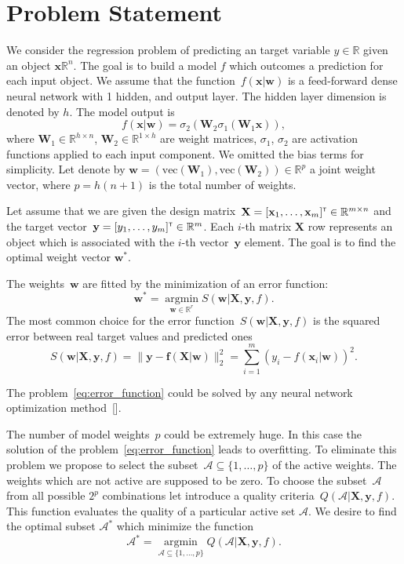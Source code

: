 \documentclass[a4paper,12pt]{article}
\theoremstyle{plain} %
\theoremstyle{definition} %
\theoremstyle{remark} %
\newcommand{\bw}{\mathbf{w}}
\newcommand{\by}{\mathbf{y}}
\newcommand{\bx}{\mathbf{x}}
\newcommand{\cA}{\mathcal{A}}
\newcommand{\bbR}{\mathbb{R}}
\newcommand{\bW}{\mathbf{W}}
\newcommand{\bX}{\mathbf{X}}
\newcommand{\T}{{\text{\tiny\sffamily\upshape\mdseries T}}}
\newcommand{\argmin}{\mathop{\arg \min}\limits}
\begin{document}
		
	\section*{Problem Statement}

	We consider the regression problem of predicting an target variable $y \in \bbR$ given an object $\bx \bbR^{n}$. 
	The goal is to build a model $f$ which outcomes a prediction for each input object.
	We assume that the function~$f (\bx | \bw)$ is a feed-forward dense neural network with 1 hidden, and output layer. The hidden layer dimension is denoted by $h$. The model output is
	\[
		f(\bx | \bw) = \sigma_2\left(\bW_2 \sigma_1(\bW_1 \bx)\right),
	\]
	where $\bW_1 \in \bbR^{h \times n}$, $\bW_2 \in \bbR^{1 \times h}$ are weight matrices, $\sigma_1$, $\sigma_2$ are activation functions applied to each input component. We omitted the bias terms for simplicity.
	Let denote by $\bw = (\text{vec}(\bW_1), \text{vec}(\bW_2)) \in \bbR^p$ a joint weight vector, where $p=h(n + 1)$ is the total number of weights.
	
	Let assume that we are given the design matrix~$\bX = [\bx_1, \dots, \bx_m]^{\T} \in \bbR^{m \times n}$ and the target vector~$\by = [y_1, \dots, y_m]^{\T} \in \bbR^{m}$. 
	Each $i$-th matrix $\bX$ row represents an object which is associated with the $i$-th vector~$\by$ element.
	The goal is to find the optimal weight vector $\bw^*$.
	
	The weights~$\bw$ are fitted by the minimization of an error function:
	\begin{equation}
	\bw^* = \argmin_{\bw \in \bbR^r} S(\bw | \bX, \by, f).
	\label{eq:error_function}
	\end{equation}
	The most common choice for the error function~$S(\bw | \bX, \by, f)$ is the squared error between real target values and predicted ones
	\[
		S(\bw | \bX, \by, f) =  \| \by - \mathbf{f}(\bX | \bw)\|_2^2 = \sum_{i=1}^m (y_i - f(\bx_i | \bw))^2.
	\]

	The problem~\ref{eq:error_function} could be solved by any neural network optimization method~[].
	
	The number of model weights~$p$ could be extremely huge. 
	In this case the solution of the problem~\ref{eq:error_function} leads to overfitting. 
	To eliminate this problem we propose to select the subset~$\cA \subseteq \{1, \dots, p\}$ of the active weights. 
	The weights which are not active are supposed to be zero.
	To choose the subset~$\cA$ from all possible $2^p$ combinations let introduce a quality criteria~$Q(\cA | \bX, \by, f)$. 
	This function evaluates the quality of a particular active set $\cA$. 
	We desire to find the optimal subset $\cA^*$ which minimize the function
	\begin{equation}
		\cA^* = \argmin_{\cA \subseteq \{1, \dots, p\}} Q(\cA | \bX, \by, f).
		\label{eq:quality_criteria}
	\end{equation}
	
\end{document}
